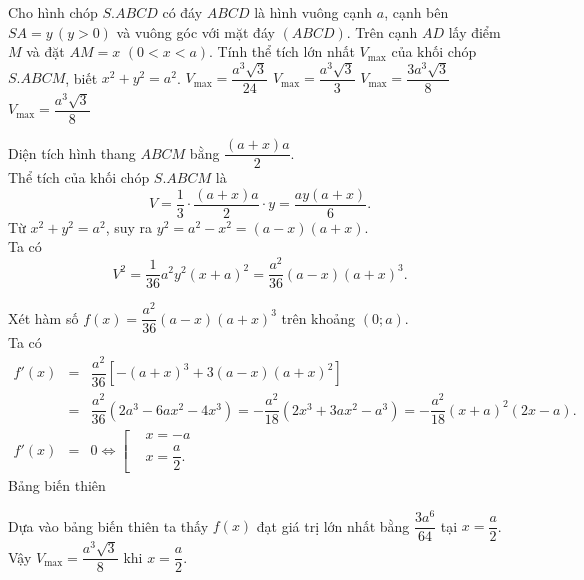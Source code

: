 \begin{ex}%
 Cho hình chóp $S.ABCD$ có đáy $ABCD$ là hình vuông cạnh $a$, cạnh bên $SA=y \, (y>0)$ và vuông góc với mặt đáy $(ABCD)$. Trên cạnh $AD$ lấy điểm $M$ và đặt $AM=x$ $(0<x<a)$. Tính thể tích lớn nhất $V_{\max}$ của khối chóp $S.ABCM$, biết $x^2+y^2=a^2$.
 \choice
  {$V_{\max}=\dfrac{a^3\sqrt{3}}{24}$}
  {$V_{\max}=\dfrac{a^3\sqrt{3}}{3}$}
  {$V_{\max}=\dfrac{3a^3\sqrt{3}}{8}$}
  {\True $V_{\max}=\dfrac{a^3\sqrt{3}}{8}$}
 \loigiai
  {
  \immini
  {
  Diện tích hình thang $ABCM$ bằng $\dfrac{(a+x)a}{2}$.\\
  Thể tích của khối chóp $S.ABCM$ là
  $$V = \dfrac{1}{3} \cdot \dfrac{(a+x)a}{2}\cdot y = \dfrac{ay(a+x)}{6}.$$
  Từ $x^2 + y^2 = a^2$, suy ra $y^2 = a^2 - x^2 = (a-x)(a+x)$.\\
  Ta có
  $$V^2 = \dfrac{1}{36}a^2y^2(x+a)^2 = \dfrac{a^2}{36}(a-x)(a+x)^3.$$
  }
  {
  }
  \noindent
  Xét hàm số $f(x) = \dfrac{a^2}{36}(a-x)(a+x)^3$ trên khoảng $(0;a)$.\\
  Ta có
  \allowdisplaybreaks
  \begin{eqnarray*}
   f'(x) &=& \dfrac{a^2}{36}\left[ -(a+x)^3 + 3(a-x)(a+x)^2 \right]\\
   &=& \dfrac{a^2}{36}(2a^3-6ax^2-4x^3)=-\dfrac{a^2}{18}(2x^3+3ax^2-a^3) = -\dfrac{a^2}{18}(x+a)^2(2x-a).\\
   f'(x) &=& 0 \Leftrightarrow \left[\begin{aligned} & x = -a \\& x = \dfrac{a}{2}.\end{aligned}\right.
  \end{eqnarray*}
  Bảng biến thiên
  \begin{center}
  \end{center}
  Dựa vào bảng biến thiên ta thấy $f(x)$ đạt giá trị lớn nhất bằng $\dfrac{3a^6}{64}$ tại $x = \dfrac{a}{2}$.\\
  Vậy $V_{\max} = \dfrac{a^3 \sqrt{3}}{8}$ khi $x=\dfrac{a}{2}$.
  }
\end{ex}


